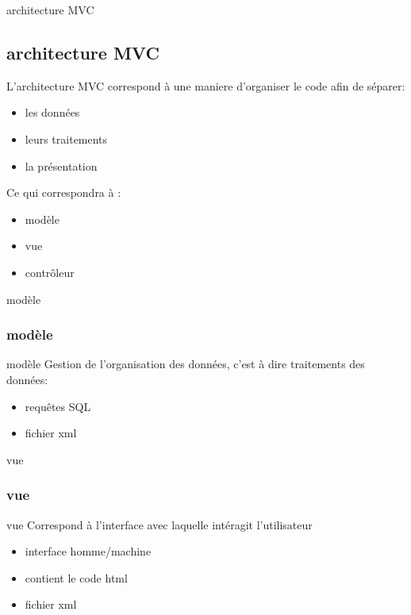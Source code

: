 \documentclass{beamer}
\begin{document}
\begin{frame}{architecture MVC}
 \subsection{architecture MVC}
	L'architecture MVC correspond à une maniere d'organiser le code afin de séparer:
	\begin{itemize}
		\item les données
		\item leurs traitements
		\item la présentation
	\end{itemize}

	Ce qui correspondra à :
	\begin{itemize}
		\item modèle
		\item vue
		\item contrôleur
	\end{itemize}
\end{frame}

\begin{frame}{modèle}
   \subsubsection{modèle}
	\begin{block}{modèle}
	Gestion de l'organisation des données, c'est à dire traitements des données:
		\begin{itemize}
			\item requêtes SQL
			\item fichier xml
		\end{itemize}
	\end{block}
\end{frame}


\begin{frame}{vue}
   \subsubsection{vue}
	\begin{block}{vue}
	Correspond à l'interface avec laquelle intéragit l'utilisateur
		\begin{itemize}
			\item interface homme/machine
			\item contient le code html
			\item fichier xml
		\end{itemize}
	\end{block}	
\end{frame}
\end{document}
